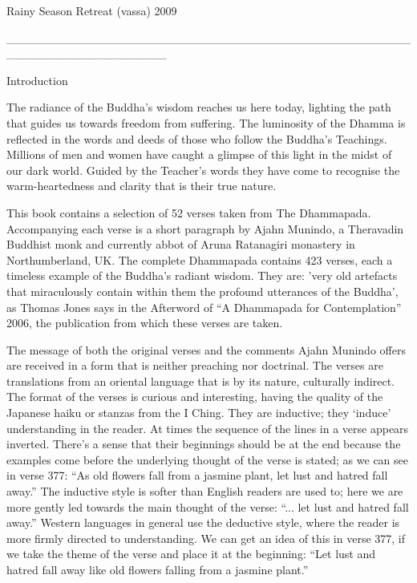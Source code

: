 \documentclass[a4paper,portrait,12pt]{article}
\begin{document}
Rainy Season Retreat (vassa) 2009





\_\_\_\_\_\_\_\_\_\_\_\_\_\_\_\_\_\_\_\_\_\_\_\_\_\_\_\_\_\_\_\_\_\_\_\_\_\_\_\_\_\_\_\_\_\_\_\_\_\_\_\_\_\_\_\_\_\_\_\_\_\_\_\_\_\_\_





Introduction








The radiance of the Buddha's wisdom reaches us here today, lighting the path that guides us towards freedom from suffering. The luminosity of the Dhamma is reflected in the words and deeds of those who follow the Buddha's Teachings. Millions of men and women have caught a glimpse of this light in the midst of our dark world. Guided by the Teacher's words they have come to recognise the warm-heartedness and clarity that is their true nature.


	This book contains a selection of 52 verses taken from The Dhammapada. Accompanying each verse is a short paragraph by Ajahn Munindo, a Theravadin Buddhist monk and currently abbot of Aruna Ratanagiri monastery in Northumberland, UK. The complete Dhammapada contains 423 verses, each a timeless example of the Buddha's radiant wisdom. They are: 'very old artefacts that miraculously contain within them the profound utterances of the Buddha', as Thomas Jones says in the Afterword of ``A Dhammapada for Contemplation'' 2006, the publication from which these verses are taken. 


	The message of both the original verses and the comments Ajahn Munindo offers are received in a form that is neither preaching nor doctrinal. The verses are translations from an oriental language that is by its nature, culturally indirect. The format of the verses is curious and interesting, having the quality of the Japanese haiku or stanzas from the I Ching. They are inductive; they `induce' understanding in the reader. At times the sequence of the lines in a verse appears inverted. There's a sense that their beginnings should be at the end because the examples come before the underlying thought of the verse is stated; as we can see in verse 377: ``As old flowers fall from a jasmine plant, let lust and hatred fall away.'' The inductive style is softer than English readers are used to; here we are more gently led towards the main thought of the verse: ``... let lust and hatred fall away.'' Western languages in general use the deductive style, where the reader is more firmly directed to understanding. We can get an idea of this in verse 377, if we take the theme of the verse and place it at the beginning: ``Let lust and hatred fall away like old flowers falling from a jasmine plant.'' 
\end{document}

